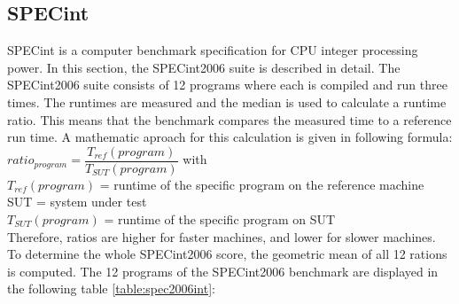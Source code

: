 \subsection{SPECint}
SPECint is a computer benchmark specification for CPU integer processing power. In this section, the SPECint2006 suite is described in detail. The SPECint2006 suite consists of 12 programs where each is compiled and run three times. The runtimes are measured and the median is used to calculate a runtime ratio. This means that the benchmark compares the measured time to a reference run time. A mathematic aproach for this calculation is given in following formula:
$ ratio_{program} = \dfrac{T_{ref}(program)}{T_{SUT}(program)} $ with\\
$ T_{ref}(program) $ = runtime of the specific program on the reference machine\\
SUT = system under test\\
$ T_{SUT}(program) $ = runtime of the specific program on SUT\\
Therefore, ratios are higher for faster machines, and lower for slower machines. To determine the whole SPECint2006 score, the geometric mean of all 12 rations is computed. The 12 programs of the SPECint2006 benchmark are displayed in the following table \ref{table:spec2006int}:
\begin{table}[H]
	\setlength\arrayrulewidth{2pt}
	\centering
	\caption{SPECint2006 programs \cite{specint}}
	\label{table:spec2006int}
\end{table}
\clearpage
